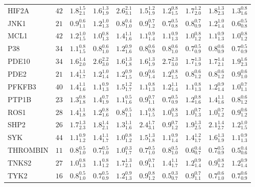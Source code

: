 \begin{tabular}{llllllllll}
HIF2A       &   $42$ &  $1.8^{1.5}_{2.1}$ &  $1.6^{1.3}_{1.9}$ &  $2.6^{2.1}_{3.1}$ &  $1.5^{1.2}_{1.9}$ &  $1.2^{0.8}_{1.5}$ &  $1.7^{1.2}_{2.0}$ &     $1.8^{1.3}_{2.3}$ &  $1.3^{0.8}_{1.6}$ \\
JNK1        &   $21$ &  $0.9^{0.6}_{1.1}$ &  $1.2^{1.0}_{1.3}$ &  $0.8^{0.4}_{1.0}$ &  $0.9^{0.7}_{1.2}$ &  $0.7^{0.5}_{0.8}$ &  $0.8^{0.7}_{0.9}$ &     $1.2^{1.0}_{1.4}$ &  $0.6^{0.5}_{0.8}$ \\
MCL1        &   $42$ &  $1.2^{1.0}_{1.5}$ &  $1.0^{0.8}_{1.3}$ &  $1.4^{1.1}_{1.6}$ &  $1.1^{0.9}_{1.4}$ &  $1.1^{0.9}_{1.3}$ &  $1.0^{0.8}_{1.2}$ &     $1.1^{0.9}_{1.3}$ &  $1.0^{0.8}_{1.2}$ \\
P38         &   $34$ &  $1.1^{0.8}_{1.5}$ &  $0.8^{0.6}_{1.0}$ &  $1.2^{0.9}_{1.6}$ &  $0.8^{0.6}_{0.9}$ &  $0.8^{0.6}_{1.0}$ &  $0.7^{0.5}_{0.9}$ &     $0.8^{0.6}_{0.9}$ &  $0.7^{0.5}_{0.9}$ \\
PDE10       &   $34$ &  $1.6^{1.4}_{2.0}$ &  $2.6^{2.2}_{3.0}$ &  $1.6^{1.3}_{1.8}$ &  $1.6^{1.3}_{1.9}$ &  $2.7^{2.3}_{3.0}$ &  $1.7^{1.3}_{1.9}$ &     $1.7^{1.4}_{2.1}$ &  $1.9^{1.6}_{2.3}$ \\
PDE2        &   $21$ &  $1.4^{1.1}_{1.7}$ &  $1.2^{1.0}_{1.4}$ &  $1.2^{0.9}_{1.5}$ &  $0.9^{0.6}_{1.4}$ &  $1.2^{0.8}_{1.5}$ &  $0.8^{0.6}_{1.2}$ &     $0.8^{0.6}_{1.2}$ &  $0.9^{0.6}_{1.0}$ \\
PFKFB3      &   $40$ &  $1.4^{1.1}_{1.6}$ &  $1.1^{0.9}_{1.3}$ &  $1.5^{1.2}_{1.7}$ &  $1.1^{0.8}_{1.3}$ &  $1.2^{1.1}_{1.4}$ &  $1.1^{0.8}_{1.3}$ &     $1.2^{0.9}_{1.4}$ &  $1.0^{0.7}_{1.1}$ \\
PTP1B       &   $23$ &  $1.3^{0.8}_{1.8}$ &  $1.4^{0.7}_{1.9}$ &  $1.1^{0.5}_{1.6}$ &  $0.9^{0.7}_{1.1}$ &  $0.7^{0.5}_{0.9}$ &  $1.2^{0.8}_{1.6}$ &     $1.4^{1.1}_{1.6}$ &  $0.8^{0.6}_{1.2}$ \\
ROS1        &   $28$ &  $1.4^{1.1}_{1.8}$ &  $1.2^{0.8}_{1.6}$ &  $0.8^{0.5}_{1.1}$ &  $1.1^{0.8}_{1.5}$ &  $1.0^{0.8}_{1.3}$ &  $1.0^{0.7}_{1.3}$ &     $1.0^{0.7}_{1.2}$ &  $0.9^{0.6}_{1.2}$ \\
SHP2        &   $26$ &  $1.7^{1.3}_{2.3}$ &  $1.8^{1.4}_{2.1}$ &  $1.3^{1.1}_{1.6}$ &  $2.4^{1.7}_{3.1}$ &  $0.9^{0.7}_{1.2}$ &  $1.9^{1.3}_{2.5}$ &     $2.1^{1.4}_{2.7}$ &  $1.2^{1.0}_{1.5}$ \\
SYK         &   $44$ &  $1.1^{0.9}_{1.2}$ &  $1.4^{1.1}_{1.7}$ &  $1.0^{0.8}_{1.2}$ &  $1.5^{1.3}_{1.8}$ &  $1.1^{0.9}_{1.4}$ &  $1.4^{1.2}_{1.7}$ &     $1.6^{1.3}_{1.9}$ &  $1.1^{0.9}_{1.3}$ \\
THROMBIN    &   $11$ &  $0.8^{0.5}_{1.0}$ &  $0.7^{0.5}_{1.0}$ &  $1.0^{0.3}_{1.7}$ &  $0.7^{0.5}_{1.0}$ &  $0.8^{0.5}_{1.0}$ &  $0.6^{0.4}_{0.7}$ &     $0.7^{0.5}_{0.9}$ &  $0.5^{0.4}_{0.6}$ \\
TNKS2       &   $27$ &  $1.0^{0.8}_{1.3}$ &  $1.1^{0.8}_{1.2}$ &  $1.7^{1.3}_{2.1}$ &  $0.9^{0.7}_{1.1}$ &  $1.4^{1.1}_{1.7}$ &  $1.2^{0.9}_{1.4}$ &     $0.9^{0.8}_{1.2}$ &  $1.2^{0.9}_{1.4}$ \\
TYK2        &   $16$ &  $0.8^{0.5}_{1.0}$ &  $0.7^{0.5}_{0.9}$ &  $1.2^{0.9}_{1.3}$ &  $0.9^{0.8}_{1.2}$ &  $0.5^{0.3}_{0.7}$ &  $0.9^{0.7}_{1.1}$ &     $0.7^{0.6}_{1.0}$ &  $0.7^{0.6}_{0.9}$ \\
\bottomrule
\end{tabular}
